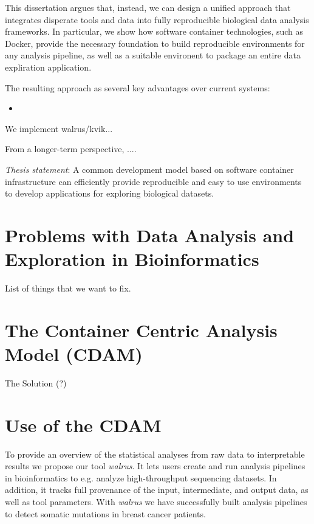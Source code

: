 This dissertation argues that, instead, we can design a unified approach that
integrates disperate tools and data into fully reproducible biological data
analysis frameworks.  In particular, we show how software container
technologies, such as Docker, provide the necessary foundation to build
reproducible environments for any analysis pipeline, as well as a suitable
environent to package an entire data expliration application. 

The resulting approach as several key advantages over current systems: 
\begin{itemize} 
    \item
\end{itemize} 



We implement walrus/kvik... 

From a longer-term perspective, ....

\emph{Thesis statement}:
A common development model based on software container infrastructure can
efficiently provide reproducible and easy to use environments to develop
applications for exploring biological datasets. 

\section{Problems with Data Analysis and Exploration in Bioinformatics} 
    List of things that we want to fix. 

\section{The Container Centric Analysis Model (CDAM)} 
    The Solution (?) 

\section{Use of the CDAM} 

To provide an overview of the statistical analyses from raw data to
interpretable results we propose our tool \emph{walrus}. It lets users create
and run analysis pipelines in bioinformatics to e.g. analyze high-throughput
sequencing datasets. In addition, it tracks full provenance of the input,
intermediate, and output data, as well as tool parameters. With \emph{walrus} we
have successfully built analysis pipelines to detect somatic mutations in breast
cancer patients. 

